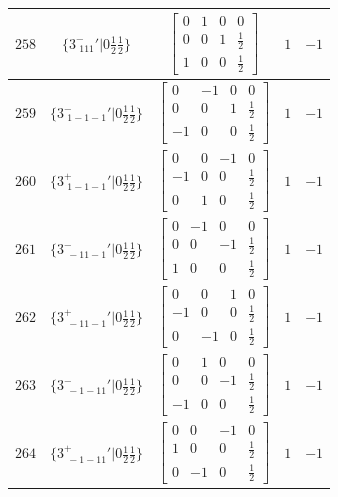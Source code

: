 \documentclass[fleqn,8pt]{jsarticle}
\begin{document}
\begin{longtable}{ccccc}
$ 258 $ & $ \{3^{-}_{\,\,111}{}'|0 \frac{1}{2} \frac{1}{2}\} $ & $ \begin{bmatrix} 0 & 1 & 0 & 0 \\ 0 & 0 & 1 & \frac{1}{2} \\ 1 & 0 & 0 & \frac{1}{2} \end{bmatrix} $ & $ 1 $ & $ -1 $ \\ \hline
$ 259 $ & $ \{3^{-}_{\,\,1-1-1}{}'|0 \frac{1}{2} \frac{1}{2}\} $ & $ \begin{bmatrix} 0 & -1 & 0 & 0 \\ 0 & 0 & 1 & \frac{1}{2} \\ -1 & 0 & 0 & \frac{1}{2} \end{bmatrix} $ & $ 1 $ & $ -1 $ \\ \hline
$ 260 $ & $ \{3^{+}_{\,\,1-1-1}{}'|0 \frac{1}{2} \frac{1}{2}\} $ & $ \begin{bmatrix} 0 & 0 & -1 & 0 \\ -1 & 0 & 0 & \frac{1}{2} \\ 0 & 1 & 0 & \frac{1}{2} \end{bmatrix} $ & $ 1 $ & $ -1 $ \\ \hline
$ 261 $ & $ \{3^{-}_{\,\,-11-1}{}'|0 \frac{1}{2} \frac{1}{2}\} $ & $ \begin{bmatrix} 0 & -1 & 0 & 0 \\ 0 & 0 & -1 & \frac{1}{2} \\ 1 & 0 & 0 & \frac{1}{2} \end{bmatrix} $ & $ 1 $ & $ -1 $ \\ \hline
$ 262 $ & $ \{3^{+}_{\,\,-11-1}{}'|0 \frac{1}{2} \frac{1}{2}\} $ & $ \begin{bmatrix} 0 & 0 & 1 & 0 \\ -1 & 0 & 0 & \frac{1}{2} \\ 0 & -1 & 0 & \frac{1}{2} \end{bmatrix} $ & $ 1 $ & $ -1 $ \\ \hline
$ 263 $ & $ \{3^{-}_{\,\,-1-11}{}'|0 \frac{1}{2} \frac{1}{2}\} $ & $ \begin{bmatrix} 0 & 1 & 0 & 0 \\ 0 & 0 & -1 & \frac{1}{2} \\ -1 & 0 & 0 & \frac{1}{2} \end{bmatrix} $ & $ 1 $ & $ -1 $ \\ \hline
$ 264 $ & $ \{3^{+}_{\,\,-1-11}{}'|0 \frac{1}{2} \frac{1}{2}\} $ & $ \begin{bmatrix} 0 & 0 & -1 & 0 \\ 1 & 0 & 0 & \frac{1}{2} \\ 0 & -1 & 0 & \frac{1}{2} \end{bmatrix} $ & $ 1 $ & $ -1 $ \\ \hline

\end{longtable}
\end{document}
